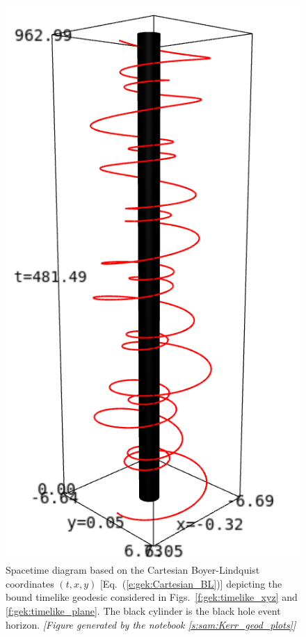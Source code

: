 \begin{figure}
\centerline{\includegraphics[height=0.4\textheight]{gek_timelike_txy.png}}
\caption[]{\label{f:gek:timelike_txy} \footnotesize
Spacetime diagram based on the Cartesian Boyer-Lindquist coordinates
$(t,x,y)$ [Eq.~(\ref{e:gek:Cartesian_BL})] depicting the bound timelike geodesic
considered in Figs.~\ref{f:gek:timelike_xyz} and \ref{f:gek:timelike_plane}. The black
cylinder is the black hole event horizon.
\textsl{[Figure generated by the notebook \ref{s:sam:Kerr_geod_plots}]}
}
\end{figure}

